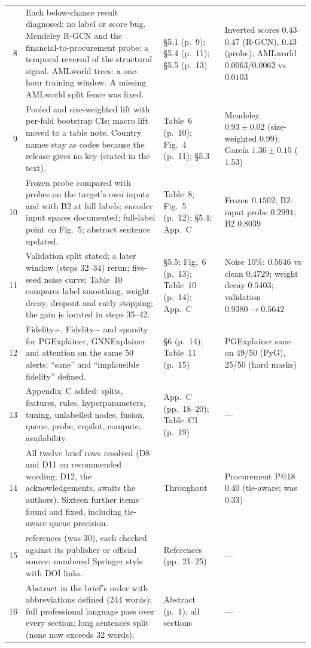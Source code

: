 \documentclass[9pt]{extarticle}
\begin{document}
\begin{tabularx}{\textwidth}{@{}r>{\raggedright\arraybackslash}X>{\raggedright\arraybackslash}p{}>{\raggedright\arraybackslash}p{}@{}}
8 & Each below-chance result diagnosed; no label or score bug. Mendeley R-GCN and the financial-to-procurement probe: a temporal reversal of the structural signal. AMLworld trees: a one-hour training window. A missing AMLworld split fence was fixed. & \S5.1 (p.~9); \S5.4 (p.~11); \S5.5 (p.~13) & Inverted scores $0.43$--$0.47$ (R-GCN), $0.43$ (probe); AMLworld $0.0063$/$0.0062$ vs $0.0103$ \\
9 & Pooled and size-weighted lift with per-fold bootstrap CIs; macro lift moved to a table note. Country names stay as codes because the release gives no key (stated in the text). & Table~6 (p.~10); Fig.~4 (p.~11); \S5.3 & Mendeley $0.93 \pm 0.02$ (size-weighted $0.99$); Garc\'ia $1.36 \pm 0.15$ ($1.53$) \\
10 & Frozen probe compared with probes on the target's own inputs and with B2 at full labels; encoder input spaces documented; full-label point on Fig.~5; abstract sentence updated. & Table~8, Fig.~5 (p.~12); \S5.4; App.~C & Frozen $0.1502$; B2-input probe $0.2991$; B2 $0.8039$ \\
11 & Validation split stated; a later window (steps 32--34) rerun; five-seed noise curve; Table~10 compares label smoothing, weight decay, dropout and early stopping; the gain is located in steps 35--42. & \S5.5; Fig.~6 (p.~13); Table~10 (p.~14); App.~C & Noise 10\%: $0.5646$ vs clean $0.4729$; weight decay $0.5403$; validation $0.9380 \rightarrow 0.5642$ \\
12 & Fidelity+, Fidelity$-$ and sparsity for PGExplainer, GNNExplainer and attention on the same 50 alerts; ``sane'' and ``implausible fidelity'' defined. & \S6 (p.~14); Table~11 (p.~15) & PGExplainer sane on 49/50 (PyG), 25/50 (hard masks) \\
13 & Appendix~C added: splits, features, rules, hyperparameters, tuning, unlabelled nodes, fusion, queue, probe, copilot, compute, availability. & App.~C (pp.~18--20); Table~C1 (p.~19) & --- \\
14 & All twelve brief rows resolved (D8 and D11 on recommended wording; D12, the acknowledgements, awaits the authors). Sixteen further items found and fixed, including tie-aware queue precision. & Throughout & Procurement P@18 $0.40$ (tie-aware; was 0.33) \\
15 & 60 references (was 30), each checked against its publisher or official source; numbered Springer style with DOI links. & References (pp.~21--25) & --- \\
16 & Abstract in the brief's order with abbreviations defined (244 words); full professional language pass over every section; long sentences split (none now exceeds 32 words). & Abstract (p.~1); all sections & --- \\

\end{tabularx}
\end{document}
